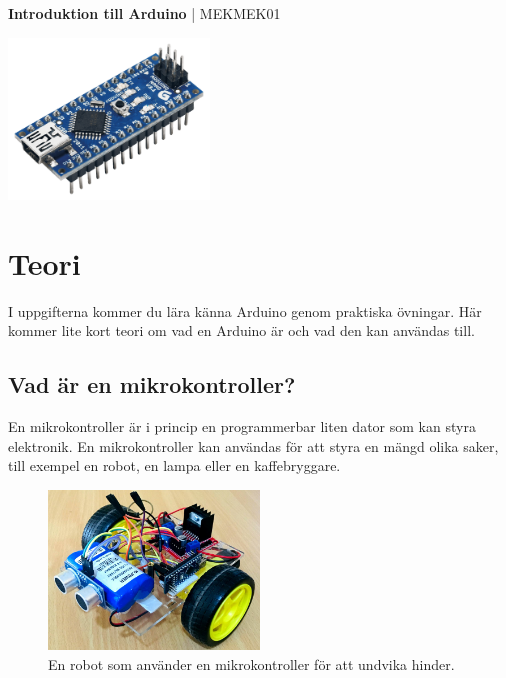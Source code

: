 \documentclass[11pt]{article}
\begin{document}
\begin{center}
      \textbf{\huge{Introduktion till Arduino}}
      \huge{| MEKMEK01}
\end{center}
\vspace{2em}

\begin{center}
      \includegraphics[width=0.4\textwidth]{nano}
\end{center}

\tableofcontents

\newpage
\raggedright{}
\section{Teori}
I uppgifterna kommer du lära känna Arduino genom praktiska övningar. Här kommer
lite kort teori om vad en Arduino är och vad den kan användas till.

\subsection{Vad är en mikrokontroller?}
En mikrokontroller är i princip en programmerbar liten dator som kan styra
elektronik. En mikrokontroller kan användas för att styra en mängd olika saker,
till exempel en robot, en lampa eller en kaffebryggare.
\begin{figure}[H]
      \centering
      \includegraphics[width=0.5\textwidth]{obstacle_robot}
      \caption{En robot som använder en mikrokontroller för att undvika
            hinder.}
      \label{fig:obstacle_robot}
\end{figure}
\end{document}
